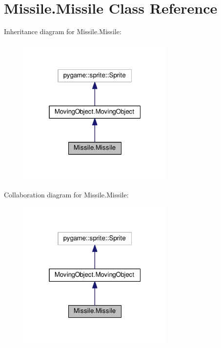 \hypertarget{classMissile_1_1Missile}{}\section{Missile.\+Missile Class Reference}
\label{classMissile_1_1Missile}


Inheritance diagram for Missile.\+Missile\+:
\nopagebreak
\begin{figure}[H]
\begin{center}
\leavevmode
\includegraphics[width=220pt]{classMissile_1_1Missile__inherit__graph}
\end{center}
\end{figure}


Collaboration diagram for Missile.\+Missile\+:
\nopagebreak
\begin{figure}[H]
\begin{center}
\leavevmode
\includegraphics[width=220pt]{classMissile_1_1Missile__coll__graph}
\end{center}
\end{figure}
